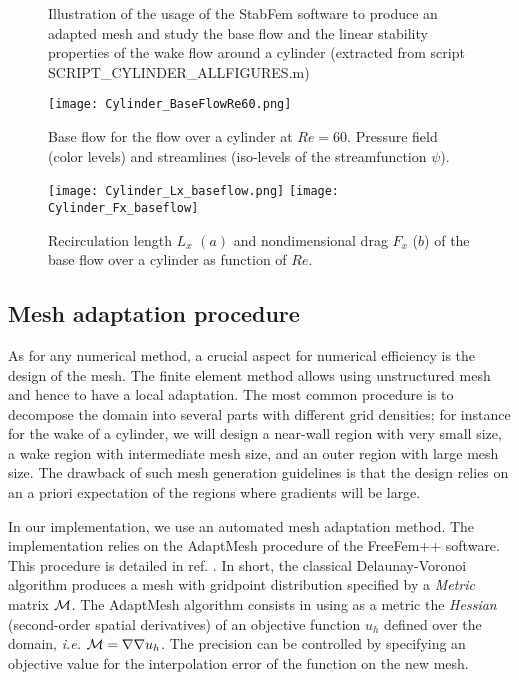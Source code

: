 \documentclass[twocolumn,10pt]{asme2ej}
\begin{document}
\begin{figure*}[t]
\small

 \normalsize
\caption{Illustration of the usage of the StabFem software to produce an adapted mesh and study the base flow and the linear stability properties of the wake flow around a cylinder 
(extracted from script {\sf  SCRIPT\_CYLINDER\_ALLFIGURES.m})}
\label{Listing2}
\end{figure*}


\begin{figure}
\texttt{[image: Cylinder\_BaseFlowRe60.png]}
\caption{Base flow for the flow over a cylinder at $Re=60$. Pressure field (color levels) and streamlines (iso-levels of the streamfunction $\psi$). }
\label{fig:Baseflow}
\end{figure}

\begin{figure}
\texttt{[image: Cylinder\_Lx\_baseflow.png]}
\texttt{[image: Cylinder\_Fx\_baseflow]}
\caption{Recirculation length $L_x$ $(a)$  and nondimensional drag $F_x$ ($b$) of the base flow over a cylinder as function of $Re$.}
\label{fig:LxandDrag}
\end{figure}




\subsection{Mesh adaptation procedure}
\vspace{.2cm}

As for any numerical method, a crucial aspect for numerical efficiency is the design of the mesh. The finite element method allows using unstructured mesh and hence to have a local adaptation. %
The most common procedure is to decompose the domain into several parts with different grid densities; for instance for the wake of a cylinder, we will design a near-wall region with very small  size, a wake region with intermediate mesh size, and an outer region with large mesh size. The drawback of such mesh generation guidelines is that the design relies on an a priori expectation of the regions where gradients will be large. 

In our implementation, we use an automated mesh adaptation method. %
The implementation relies on the AdaptMesh procedure of the FreeFem++ software. This procedure is detailed in ref. \cite{adapt}. 
In short, the classical Delaunay-Voronoi algorithm produces a mesh with gridpoint distribution specified by a {\em Metric } matrix $\cal M$. The AdaptMesh algorithm consists in using as a metric the {\em Hessian} (second-order spatial derivatives) of an objective function $u_h$ defined over the domain, \textit{i.e.} ${\cal M} = \nabla \nabla u_h$. The precision can be controlled by specifying an objective value for the interpolation error of the function on the new mesh.
\end{document}
